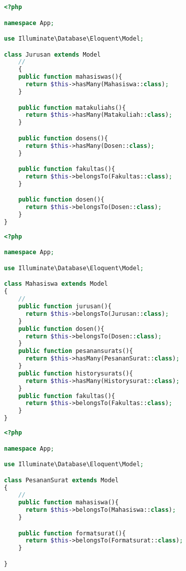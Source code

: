 \begin{lstlisting}[language=php, caption=Jurusan.php]
	<?php

namespace App;

use Illuminate\Database\Eloquent\Model;

class Jurusan extends Model
    //
    {
    public function mahasiswas(){
      return $this->hasMany(Mahasiswa::class);
    }

    public function matakuliahs(){
      return $this->hasMany(Matakuliah::class);
    }

    public function dosens(){
      return $this->hasMany(Dosen::class);
    }

    public function fakultas(){
      return $this->belongsTo(Fakultas::class);
    }

    public function dosen(){
      return $this->belongsTo(Dosen::class);
    }
}

\end{lstlisting}

\begin{lstlisting}[language=php, caption=Mahasiswa.php]
	<?php

namespace App;

use Illuminate\Database\Eloquent\Model;

class Mahasiswa extends Model
{
    //
    public function jurusan(){
      return $this->belongsTo(Jurusan::class);
    }
    public function dosen(){
      return $this->belongsTo(Dosen::class);
    }
    public function pesanansurats(){
      return $this->hasMany(PesananSurat::class);
    }
    public function historysurats(){
      return $this->hasMany(Historysurat::class);
    }
    public function fakultas(){
      return $this->belongsTo(Fakultas::class);
    }
}

\end{lstlisting}

\begin{lstlisting}[language=php, caption=PesananSurat.php]
	<?php

namespace App;

use Illuminate\Database\Eloquent\Model;

class PesananSurat extends Model
{
    //
    public function mahasiswa(){
      return $this->belongsTo(Mahasiswa::class);
    }

    public function formatsurat(){
      return $this->belongsTo(Formatsurat::class);
    }

}

\end{lstlisting}

